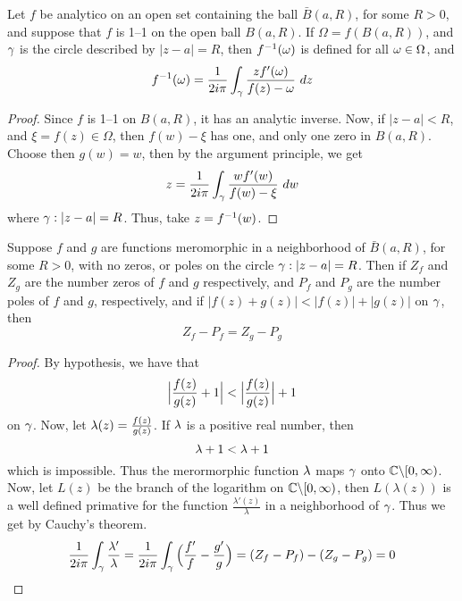 \begin{lemma}\label{5.3.3}
    Let $f$ be analytico on an open set containing the ball  $\bar{B}(a,R)$, for
    some $R>0$, and suppose that  $f$ is 1--1 on the open ball  $B(a,R)$. If
    $\Omega=f(B(a,R))$, and $\gamma$ is the circle described by $|z-a|=R$, then
    $f^{-1}(\omega)$ is defined for all $\omega \in \Omega$, and
    \begin{equation*}
        f^{-1}(\omega)=\frac{1}{2i\pi}\int_\gamma{\frac{zf'(\omega)}{f(z)-\omega} \ dz}
    \end{equation*}
\end{lemma}
\begin{proof}
    Since $f$ is 1--1 on  $B(a,R)$, it has an analytic inverse. Now, if
    $|z-a|<R$, and  $\xi=f(z) \in \Omega$, then $f(w)-\xi$ has one, and only one
    zero in $B(a,R)$. Choose then $g(w)=w$, then by the argument principle, we
    get
    \begin{equation*}
        z=\frac{1}{2i\pi}\int_\gamma{\frac{wf'(w)}{f(w)-\xi} \ dw}
    \end{equation*}
    where $\gamma:|z-a|=R$. Thus, take $z=f^{-1}(w)$.
\end{proof}

\begin{theorem}\label{5.3.4}
    Suppose $f$ and  $g$ are functions meromorphic in a neighborhood of
    $\bar{B}(a,R)$, for some $R>0$, with no zeros, or poles on the circle
    $\gamma:|z-a|=R$. Then if $Z_f$ and  $Z_g$ are the number zeros of  $f$ and  $g$
    respectively, and  $P_f$ and  $P_g$ are the number poles of  $f$ and  $g$,
    respectively, and if $|f(z)+g(z)|<|f(z)|+|g(z)|$ on $\gamma$, then
    \begin{equation*}
        Z_f-P_f=Z_g-P_g
    \end{equation*}
\end{theorem}
\begin{proof}
    By hypothesis, we have that
    \begin{equation*}
        \Big{|} \frac{f(z)}{g(z)}+1 \Big{|}<\Big{|} \frac{f(z)}{g(z)} \Big{|}+1
    \end{equation*}
    on $\gamma$. Now, let  $\lambda(z)=\frac{f(z)}{g(z)}$. If $\lambda$ is a positive real
    number, then
    \begin{equation*}
        \lambda+1<\lambda+1
    \end{equation*}
    which is impossible. Thus the merormorphic function $\lambda$ maps  $\gamma$ onto
    $\mathbb{C} \backslash [0,\infty)$. Now, let $L(z)$ be the branch of the logarithm on
    $\mathbb{C} \backslash [0,\infty)$, then $L(\lambda(z))$ is a well defined primative for
    the function $\frac{\lambda'(z)}{\lambda}$ in a neighborhood of $\gamma$. Thus
    we get by Cauchy's theorem.
    \begin{equation*}
        \frac{1}{2i\pi}\int_\gamma{\frac{\lambda'}{\lambda}}=
        \frac{1}{2i\pi}\int_\gamma{\Big{(} \frac{f'}{f}-\frac{g'}{g} \Big{)}}=
        (Z_f-P_f)-(Z_g-P_g)=0
    \end{equation*}
\end{proof}
